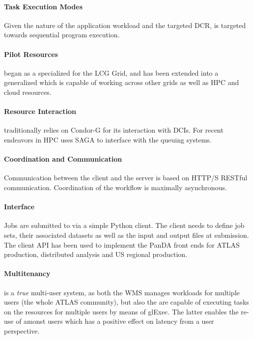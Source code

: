 \documentclass{sig-alternate}
\begin{document}
\paragraph{Task Execution Modes}

Given the nature of the application workload and the targeted DCR,
\panda is targeted  towards sequential program execution.

\paragraph{Pilot Resources}

\panda began as a specialized \pilot for the LCG Grid, and has been
extended into a generalized \pilot which is capable of working across other
grids as well as HPC\cite{} and cloud\cite{} resources.

\paragraph{Resource Interaction}

\panda traditionally relies on Condor-G for its interaction with DCIs.
For recent endeavors in HPC \panda uses SAGA to interface with the queuing
systems.

\paragraph{Coordination and Communication}

Communication between the client and the server is based on HTTP/S RESTful
communication.
Coordination of the workflow is maximally asynchronous.

\paragraph{Interface}

Jobs are submitted to \panda via a simple Python client.
The client needs to define job sets, their associated datasets as well as
the input and output files at submission.
The client API has been used to implement the PanDA front ends for ATLAS
production, distributed analysis and US regional production.

\paragraph{Multitenancy}

\panda is a \textit{true} multi-user system, as both the WMS manages workloads
for multiple users (the whole ATLAS community), but also the \pilots are
capable of executing tasks on the resources for multiple users by means of
glExec\cite{}.
The latter enables the re-use of \pilots amonst users which has a positive
effect on latency from a user perspective.
\end{document}
